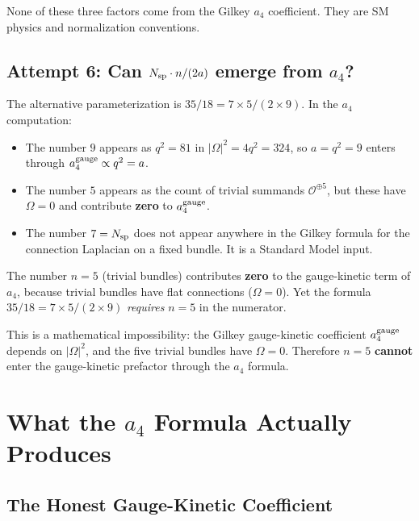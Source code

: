 \documentclass[12pt,a4paper]{article}
\theoremstyle{definition}
\begin{document}
None of these three factors come from the Gilkey $a_4$ coefficient.
They are SM physics and normalization conventions.

\subsection{Attempt 6: Can $N_{\rm sp} \cdot n / (2a)$ emerge from $a_4$?}

The alternative parameterization is $35/18 = 7 \times 5/(2 \times 9)$.
In the $a_4$ computation:
\begin{itemize}
\item The number $9$ appears as $q^2 = 81$ in $|\Omega|^2 = 4q^2 = 324$,
  so $a = q^2 = 9$ enters through $a_4^{\rm gauge} \propto q^2 = a$.
\item The number $5$ appears as the count of trivial summands
  $\mathcal{O}^{\oplus 5}$, but these have $\Omega = 0$ and contribute
  \textbf{zero} to $a_4^{\rm gauge}$.
\item The number $7 = N_{\rm sp}$ does not appear anywhere in the
  Gilkey formula for the connection Laplacian on a fixed bundle.
  It is a Standard Model input.
\end{itemize}

\begin{tcolorbox}[colback=red!5!white, colframe=red!60!black,
  title=Key Finding]
The number $n = 5$ (trivial bundles) contributes \textbf{zero} to the
gauge-kinetic term of $a_4$, because trivial bundles have flat
connections ($\Omega = 0$).  Yet the formula $35/18 = 7 \times 5/(2 \times 9)$
\emph{requires} $n = 5$ in the numerator.

This is a mathematical impossibility: the Gilkey gauge-kinetic coefficient
$a_4^{\rm gauge}$ depends on $|\Omega|^2$, and the five trivial bundles
have $\Omega = 0$.  Therefore $n = 5$ \textbf{cannot} enter the
gauge-kinetic prefactor through the $a_4$ formula.
\end{tcolorbox}

\section{What the $a_4$ Formula Actually Produces}
\label{sec:actual}

\subsection{The Honest Gauge-Kinetic Coefficient}
\end{document}
